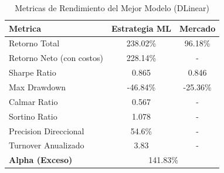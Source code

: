 \begin{table}[H]
\centering
\caption{Metricas de Rendimiento del Mejor Modelo (DLinear)}
\label{tab:best_metrics}
\begin{tabular}{lcc}
\toprule
\textbf{Metrica} & \textbf{Estrategia ML} & \textbf{Mercado} \\
\midrule
Retorno Total & 238.02\% & 96.18\% \\
Retorno Neto (con costos) & 228.14\% & - \\
Sharpe Ratio & 0.865 & 0.846 \\
Max Drawdown & -46.84\% & -25.36\% \\
Calmar Ratio & 0.567 & - \\
Sortino Ratio & 1.078 & - \\
Precision Direccional & 54.6\% & - \\
Turnover Anualizado & 3.83 & - \\
\midrule
\textbf{Alpha (Exceso)} & \multicolumn{2}{c}{141.83\%} \\
\bottomrule
\end{tabular}
\end{table}
